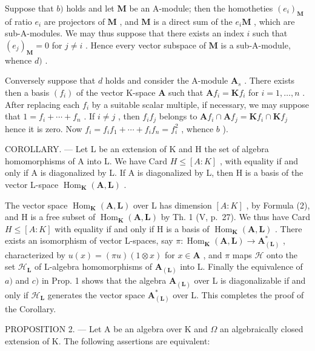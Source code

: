 Suppose that \(b)\) holds and let \(\mathbf{M}\) be an A-module; then the homotheties \((e_i)_{\mathbf{M}}\) of ratio \(e_i\) are projectors of \(\mathbf{M}\) , and \(\mathbf{M}\) is a direct sum of the \(e_i\mathbf{M}\) , which are sub-A-modules. We may thus suppose that there exists an index \(i\) such that \((e_j)_{\mathbf{M}} = 0\) for \(j \neq i\) . Hence every vector subspace of \(\mathbf{M}\) is a sub-A-module, whence \(d)\) .

Conversely suppose that \(d\) holds and consider the A-module \(\mathbf{A}_{s}\) . There exists then a basis \((f_{i})\) of the vector K-space \(\mathbf{A}\) such that \(\mathbf{A}f_{i} = \mathbf{K}f_{i}\) for \(i = 1, \ldots, n\) . After replacing each \(f_{i}\) by a suitable scalar multiple, if necessary, we may suppose that \(1 = f_{i} + \cdots + f_{n}\) . If \(i \neq j\) , then \(f_{i}f_{j}\) belongs to \(\mathbf{A}f_{i} \cap \mathbf{A}f_{j} = \mathbf{K}f_{i} \cap \mathbf{K}f_{j}\) hence it is zero. Now \(f_{i} = f_{i}f_{1} + \cdots + f_{i}f_{n} = f_{i}^{2}\) , whence \(b\) ).

COROLLARY. --- Let L be an extension of K and H the set of algebra homomorphisms of A into L. We have Card \(H \leq [A:K]\) , with equality if and only if A is diagonalized by L. If A is diagonalized by L, then H is a basis of the vector L-space \(\operatorname{Hom}_{\mathbf{K}}(\mathbf{A},\mathbf{L})\) .

The vector space \(\operatorname{Hom}_{\mathbf{K}}(\mathbf{A},\mathbf{L})\) over L has dimension \([A:K]\) , by Formula (2), and H is a free subset of \(\operatorname{Hom}_{\mathbf{K}}(\mathbf{A},\mathbf{L})\) by Th. 1 (V, p.~27). We thus have Card \(H \leqslant [A:K]\) with equality if and only if H is a basis of \(\operatorname{Hom}_{\mathbf{K}}(\mathbf{A},\mathbf{L})\) . There exists an isomorphism of vector L-spaces, say \(\pi: \operatorname{Hom}_{\mathbf{K}}(\mathbf{A}, \mathbf{L}) \to \mathbf{A}_{(\mathbf{L})}^{*}\) , characterized by \(u(x) = (\pi u)(1 \otimes x)\) for \(x \in \mathbf{A}\) , and \(\pi\) maps \(\mathcal{H}\) onto the set \(\mathcal{H}_{\mathbf{L}}\) of L-algebra homomorphisms of \(\mathbf{A}_{(\mathbf{L})}\) into L. Finally the equivalence of \(a)\) and \(c)\) in Prop. 1 shows that the algebra \(\mathbf{A}_{(\mathbf{L})}\) over L is diagonalizable if and only if \(\mathcal{H}_{\mathbf{L}}\) generates the vector space \(\mathbf{A}_{(\mathbf{L})}^{*}\) over L. This completes the proof of the Corollary.

PROPOSITION 2. --- Let A be an algebra over K and \(\Omega\) an algebraically closed extension of K. The following assertions are equivalent:

